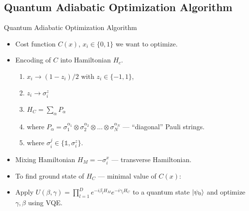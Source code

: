 \subsection{Quantum Adiabatic Optimization Algorithm}
\begingroup
\begin{frame}{Quantum Adiabatic Optimization Algorithm}
    \begin{block}{}
    \begin{itemize}
        \item Cost function $C(x)$, $x_i\in\{0,1\}$ we want to optimize.
        \item Encoding of $C$ into Hamiltonian $H_c$.
        \begin{enumerate}
            \item $x_i \rightarrow (1-z_i)/2$ with $z_i\in\{-1,1\}$,
            \item $z_i \rightarrow \sigma_i^z$
            \item $H_C = \sum_\alpha P_\alpha$
            \item where  $P_\alpha = \sigma_1^{\alpha_1}\otimes\sigma_2^{\alpha_2}\otimes \ldots\otimes\sigma_N^{\alpha_N}$ --- ``diagonal'' Pauli strings.
            \item where $\sigma_i^j \in \{\mathbb{1}, \sigma_i^z\}$.
        \end{enumerate}
        \item Mixing Hamiltonian $H_M = -\sigma_i^x$ --- transverse Hamiltonian.
        \item To find ground state of $H_C$ --- minimal value of $C(x)$:
        \item Apply $U(\beta, \gamma) = \prod_{l=1}^D e^{-i \beta_l H_M}
        e^{-i \gamma_l H_C}$ to a quantum state $\ket{\psi_0}$ and
        optimize $\gamma, \beta$ using VQE.
    \end{itemize}
    \end{block}
\end{frame}
\endgroup
\begingroup
